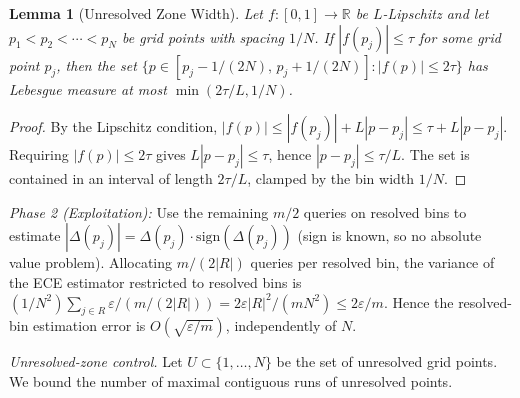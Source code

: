 \documentclass{article}
\newcommand{\Lip}{L}
\newcommand{\errrate}{\varepsilon}
\newcommand{\nsamples}{m}
\newcommand{\calmap}{\Delta}
\newtheorem{lemma}[theorem]{Lemma}
\theoremstyle{definition}
\begin{document}
\begin{lemma}[Unresolved Zone Width]
\label{lem:unresolved-width}
Let $f: [0,1] \to \mathbb{R}$ be $\Lip$-Lipschitz and let $p_1 < p_2 < \cdots < p_N$ be grid points with spacing $1/N$. If $|f(p_j)| \leq \tau$ for some grid point $p_j$, then the set $\{p \in [p_j - 1/(2N),\, p_j + 1/(2N)] : |f(p)| \leq 2\tau\}$ has Lebesgue measure at most $\min(2\tau/\Lip, 1/N)$.
\end{lemma}
\begin{proof}
By the Lipschitz condition, $|f(p)| \leq |f(p_j)| + \Lip|p - p_j| \leq \tau + \Lip|p - p_j|$. Requiring $|f(p)| \leq 2\tau$ gives $\Lip|p - p_j| \leq \tau$, hence $|p - p_j| \leq \tau/\Lip$. The set is contained in an interval of length $2\tau/\Lip$, clamped by the bin width $1/N$.
\end{proof}

\emph{Phase 2 (Exploitation):} Use the remaining $\nsamples/2$ queries on resolved bins to estimate $|\calmap(p_j)| = \calmap(p_j) \cdot \mathrm{sign}(\calmap(p_j))$ (sign is known, so no absolute value problem). Allocating $\nsamples/(2|R|)$ queries per resolved bin, the variance of the ECE estimator restricted to resolved bins is $(1/N^2)\sum_{j \in R} \errrate/(m/(2|R|)) = 2\errrate|R|^2/(\nsamples N^2) \leq 2\errrate/\nsamples$. Hence the resolved-bin estimation error is $O(\sqrt{\errrate/\nsamples})$, independently of $N$.

\emph{Unresolved-zone control.} Let $U \subset \{1,\ldots,N\}$ be the set of unresolved grid points. We bound the number of maximal contiguous runs of unresolved points.
\end{document}
